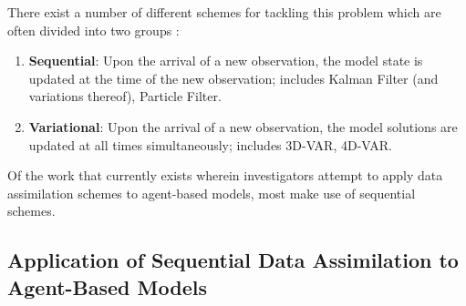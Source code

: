 There exist a number of different schemes for tackling this problem which are
often divided into two groups \citep{talagrand1997assimilation}:
\begin{enumerate}
    \item \textbf{Sequential}: Upon the arrival of a new observation, the model
        state is updated at the time of the new observation; includes Kalman
        Filter (and variations thereof), Particle Filter.
    \item \textbf{Variational}: Upon the arrival of a new observation, the model
        solutions are updated at all times simultaneously; includes 3D-VAR,
        4D-VAR.
\end{enumerate}

Of the work that currently exists wherein investigators attempt to apply data
assimilation schemes to agent-based models, most make use of sequential schemes. 

\subsection[Application of Data Assimilation to Agent-Based Models]{Application of Sequential Data Assimilation to Agent-Based
Models}\label{sub:lit_rev:da_abm}




